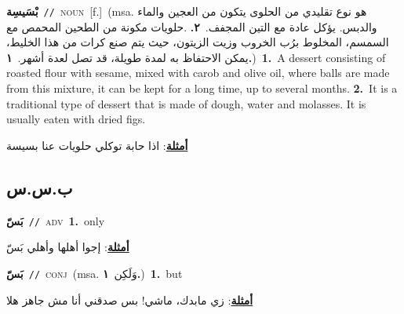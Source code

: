 \documentclass[10pt,a4paper,twoside]{article} %
\begin{document}
\begin{multicols}{2}
{\setlength\topsep{0pt}\textbf{\foreignlanguage{arabic}{بْسَيسِة}}\ {\color{gray}\texttt{//}\color{black}}\ \textsc{noun}\ [f.]\ \color{gray}(msa. \foreignlanguage{arabic}{هو نوع تقليدي من الحلوى يتكون من العجين والماء والدبس. يؤكل عادة مع التين المجفف.}~\foreignlanguage{arabic}{\textbf{٢.}}  .\foreignlanguage{arabic}{حلويات مكونة من الطحين المحمص مع السمسم، المخلوط برُب الخروب وزيت الزيتون، حيث يتم صنع كرات من هذا الخليط، يمكن الاحتفاظ به لمدة طويلة، قد تصل لعدة أشهر.}~\foreignlanguage{arabic}{\textbf{١.}})\color{black}\ \textbf{1.}~A dessert consisting of roasted flour with sesame, mixed with carob and olive oil, where balls are made from this mixture, it can be kept for a long time, up to several months.  \textbf{2.}~It is a traditional type of dessert that is made of dough, water and molasses. It is usually eaten with dried figs.\  \begin{flushright}\color{gray}\foreignlanguage{arabic}{\textbf{\underline{\foreignlanguage{arabic}{أمثلة}}}: اذا حابة توكلي حلويات عنا بسيسة}\end{flushright}\color{black}} \vspace{2mm}

\vspace{-3mm}
\subsection*{\color{blue}\foreignlanguage{arabic}{ب.س.س}\color{blue}{ (ntws)}} 

{\setlength\topsep{0pt}\textbf{\foreignlanguage{arabic}{بَسّ}}\ {\color{gray}\texttt{//}\color{black}}\ \textsc{adv}\ \textbf{1.}~only\  \begin{flushright}\color{gray}\foreignlanguage{arabic}{\textbf{\underline{\foreignlanguage{arabic}{أمثلة}}}: إجوا أهلها وأهلي بَسّ}\end{flushright}\color{black}} \vspace{2mm}

{\setlength\topsep{0pt}\textbf{\foreignlanguage{arabic}{بَسّ}}\ {\color{gray}\texttt{//}\color{black}}\ \textsc{conj}\ \color{gray}(msa. \foreignlanguage{arabic}{وَلَكِن}~\foreignlanguage{arabic}{\textbf{١.}})\color{black}\ \textbf{1.}~but\  \begin{flushright}\color{gray}\foreignlanguage{arabic}{\textbf{\underline{\foreignlanguage{arabic}{أمثلة}}}: زي مابدك، ماشي! بس صدقني أنا مش جاهز هلا}\end{flushright}\color{black}} \vspace{2mm}


\end{multicols}
\end{document}
